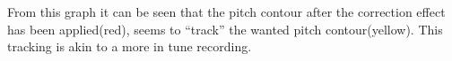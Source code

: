 \documentclass[a1paper,portrait,fontscale=0.42]{baposter}
\begin{document}
\begin{poster}
{\vspace{2mm}
\setlength{\fboxsep}{0pt}
\vspace{2mm}

From this graph it can be seen that the pitch contour after the correction effect
has been applied(red), seems to ``track'' the wanted pitch contour(yellow). This
tracking is akin to a more in tune recording.

}

\end{poster}
\end{document}
